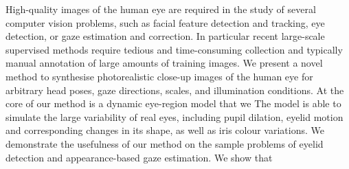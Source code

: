 
High-quality images of the human eye are required in the study of several computer vision problems, such as facial feature detection and tracking, eye detection, or gaze estimation and correction.
In particular recent large-scale supervised methods require tedious and time-consuming collection and typically manual annotation of large amounts of training images.
We present a novel method to synthesise photorealistic close-up images of the human eye for arbitrary head poses, gaze directions, scales, and illumination conditions.
At the core of our method is a dynamic eye-region model that we 
The model is able to simulate the large variability of real eyes, including pupil dilation, eyelid motion and corresponding changes in its shape, as well as iris colour variations.
We demonstrate the usefulness of our method on the sample problems of eyelid detection and appearance-based gaze estimation.
We show that 